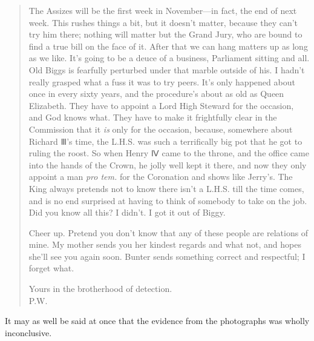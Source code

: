 \begin{quotation}
The Assizes will be the first week in November\allowbreak---\allowbreak in fact, the end of next week. This rushes things a bit, but it doesn't matter, because they can't try him there; nothing will matter but the Grand Jury, who are bound to find a true bill on the face of it. After that we can hang matters up as long as we like. It's going to be a deuce of a business, Parliament sitting and all. Old Biggs is fearfully perturbed under that marble outside of his. I hadn't really grasped what a fuss it was to try peers. It's only happened about once in every sixty years, and the procedure's about as old as Queen Elizabeth. They have to appoint a Lord High Steward for the occasion, and God knows what. They have to make it frightfully clear in the Commission that it \textit{is} only for the occasion, because, somewhere about Richard Ⅲ's time, the L.H.S. was such a terrifically big pot that he got to ruling the roost. So when Henry Ⅳ came to the throne, and the office came into the hands of the Crown, he jolly well kept it there, and now they only appoint a man \textit{pro tem.} for the Coronation and shows like Jerry's. The King always pretends not to know there isn't a L.H.S. till the time comes, and is no end surprised at having to think of somebody to take on the job. Did you know all this? I didn't. I got it out of Biggy.

Cheer up. Pretend you don't know that any of these people are relations of mine. My mother sends you her kindest regards and what not, and hopes she'll see you again soon. Bunter sends something correct and respectful; I forget what.

\begin{flushright}
Yours in the brotherhood of detection.\\
\textsc{P.W.}
\end{flushright}
\end{quotation}
It may as well be said at once that the evidence from the photographs was wholly inconclusive.
